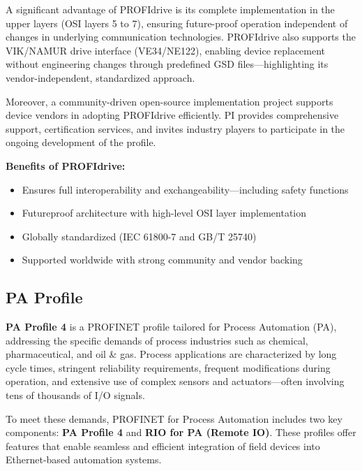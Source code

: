 \documentclass[conference]{IEEEtran}
\begin{document}
A significant advantage of PROFIdrive is its complete implementation in the upper layers (OSI layers 5 to 7), ensuring future-proof operation independent of changes in underlying communication technologies. PROFIdrive also supports the VIK/NAMUR drive interface (VE34/NE122), enabling device replacement without engineering changes through predefined GSD files—highlighting its vendor-independent, standardized approach.

Moreover, a community-driven open-source implementation project supports device vendors in adopting PROFIdrive efficiently. PI provides comprehensive support, certification services, and invites industry players to participate in the ongoing development of the profile.

\textbf{Benefits of PROFIdrive:}
\begin{itemize}
    \item Ensures full interoperability and exchangeability—including safety functions
    \item Futureproof architecture with high-level OSI layer implementation
    \item Globally standardized (IEC 61800-7 and GB/T 25740)
    \item Supported worldwide with strong community and vendor backing
\end{itemize}

\subsection{PA Profile }
\label{subsec: pAProfile}
\textbf{PA Profile 4} is a PROFINET profile tailored for Process Automation (PA), addressing the specific demands of process industries such as chemical, pharmaceutical, and oil \& gas. Process applications are characterized by long cycle times, stringent reliability requirements, frequent modifications during operation, and extensive use of complex sensors and actuators—often involving tens of thousands of I/O signals.

To meet these demands, PROFINET for Process Automation includes two key components: \textbf{PA Profile 4} and \textbf{RIO for PA (Remote IO)}. These profiles offer features that enable seamless and efficient integration of field devices into Ethernet-based automation systems.
\end{document}
